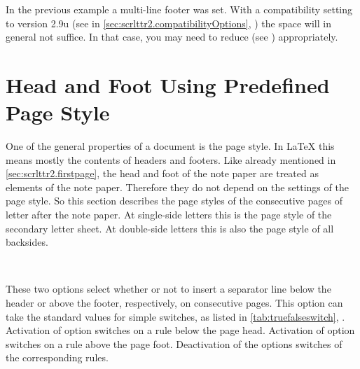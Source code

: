 In the previous example a multi-line footer was set.  With a compatibility
setting to version 2.9u (see  in
\autoref{sec:scrlttr2.compatibilityOptions},
) the space will in general not
suffice. In that case, you may need to reduce  (see
) appropriately.%
%
%
%
%
%
%
%
%
%





\section{Head and Foot Using Predefined Page Style}
\label{sec:scrlttr2.pagestyle}
%
%
%

One of the general properties of a document is the page style. In {\LaTeX}
this means mostly the contents of headers and
footers. Like already mentioned in
\autoref{sec:scrlttr2.firstpage}, the head and foot of the note paper are
treated as elements of the note paper. Therefore they do not depend on the
settings of the page style. So this section describes the page styles of the
consecutive pages of letter after the note paper. At single-side letters this is
the page style of the secondary letter sheet. At double-side letters this is
also the page style of all backsides.

\begin{Declaration}
  \\
\end{Declaration}
%
%
These two options select whether or not to insert a separator
line below the header or above the
footer, respectively, on consecutive pages.  This option can take the standard
values for simple switches, as listed in \autoref{tab:truefalseswitch},
.
Activation of option
 switches on a rule below the page
head. Activation of option
 switches on a rule above the page foot. Deactivation of
the options switches of the corresponding rules.

